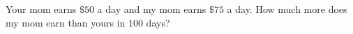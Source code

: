 Your mom earns $\$50$ a day and my mom earns $\$75$ a day. How much more does my mom earn than yours in $100$ days?
